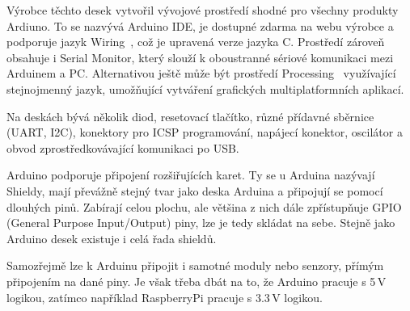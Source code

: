 	Výrobce těchto desek vytvořil vývojové prostředí shodné pro všechny produkty Ardiuno. To se nazvývá Arduino IDE, je dostupné zdarma na webu výrobce a podporuje jazyk Wiring~\cite{embed_about_wiring_2011}, což je upravená verze jazyka C. Prostředí zároveň obsahuje i Serial Monitor, který slouží k oboustranné sériové komunikaci mezi Arduinem a PC. Alternativou ještě může být prostředí Processing~\cite{embed_about_processing_2015} využívající stejnojmenný jazyk, umožňující vytváření grafických multiplatformních aplikací.
	
	Na deskách bývá několik diod, resetovací tlačítko, různé přídavné sběrnice (UART, I2C), konektory pro ICSP programování, napájecí konektor, oscilátor a obvod zprostředkovávající komunikaci po USB.
	
Arduino podporuje připojení rozšiřujících karet. Ty se u Arduina nazývají Shieldy, mají převážně stejný tvar jako deska Arduina a připojují se pomocí dlouhých pinů. Zabírají celou plochu, ale většina z nich dále zpřístupňuje GPIO (General Purpose Input/Output) piny, lze je tedy skládat na sebe. Stejně jako Arduino desek existuje i celá řada shieldů.
	
Samozřejmě lze k Arduinu připojit i samotné moduly nebo senzory, přímým připojením na dané piny. Je však třeba dbát na to, že Arduino pracuje s 5\,V logikou, zatímco například RaspberryPi pracuje s 3.3\,V logikou.
	
